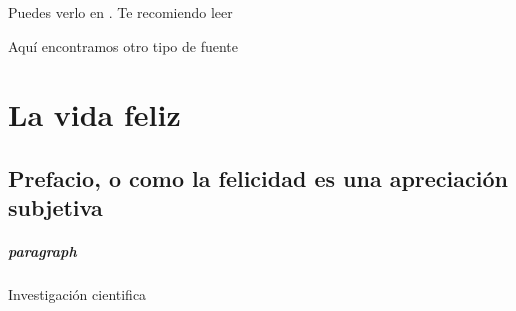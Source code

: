 \documentclass[a4paper,openright,12pt]{report}
\begin{document}
	
	Puedes verlo en \cite{Patricio2011}. Te recomiendo leer \cite{Patricio2011 ,Zacarias2009, latexcompanion}
	
	Aquí encontramos otro tipo de fuente \cite{knuthwebsite}
	
	\chapter{La vida feliz}
	\section[Prefacio]{Prefacio, o como 
		la felicidad es una apreciación subjetiva}
	\paragraph{paragraph} Investigación cientifica
	
	
	
\end{document}
